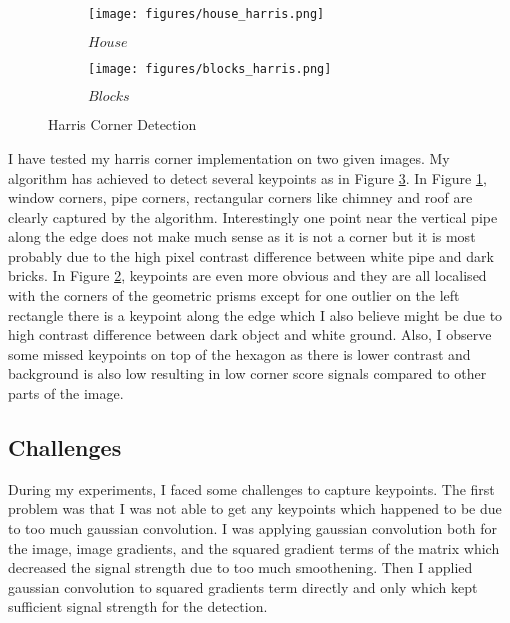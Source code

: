 \documentclass{article}
\begin{document}
\begin{figure}[!h]
     \begin{subfigure}[b]{0.4\textwidth}
         \centering
         \texttt{[image: figures/house\_harris.png]}
         \caption{$House$}
         \label{fig:house}
     \end{subfigure}
     \hfill
     \begin{subfigure}[b]{0.4\textwidth}
         \centering
         \texttt{[image: figures/blocks\_harris.png]}
         \caption{$Blocks$}
         \label{fig:block}
     \end{subfigure}
        \caption{Harris Corner Detection}
        \label{fig:harr}
\end{figure}
    



\begin{center}
    \raggedright
    I have tested my harris corner implementation on two given images. My algorithm has achieved to detect several keypoints as in Figure \ref{fig:harr}. In Figure \ref{fig:house}, window corners, pipe corners, rectangular corners like chimney and roof are clearly captured by the algorithm. Interestingly one point near the vertical pipe along the edge does not make much sense as it is not a corner but it is most probably due to the high pixel contrast difference between white pipe and dark bricks. In Figure \ref{fig:block}, keypoints are even more obvious and they are all localised with the corners of the geometric prisms except for one outlier on the left rectangle there is a keypoint along the edge which I also believe might be due to high contrast difference between dark object and white ground. Also, I observe some missed keypoints on top of the hexagon as there is lower contrast and background is also low resulting in low corner score signals compared to other parts of the image.
\end{center}



\subsection{Challenges}

\begin{center}
    \raggedright
    During my experiments, I faced some challenges to capture keypoints. The first problem was that I was not able to get any keypoints which happened to be due to too much gaussian convolution. I was applying gaussian convolution both for the image, image gradients, and the squared gradient terms of the matrix which decreased the signal strength due to too much smoothening. Then I applied gaussian convolution to squared gradients term directly and only which kept sufficient signal strength for the detection.
\end{center}
\end{document}
